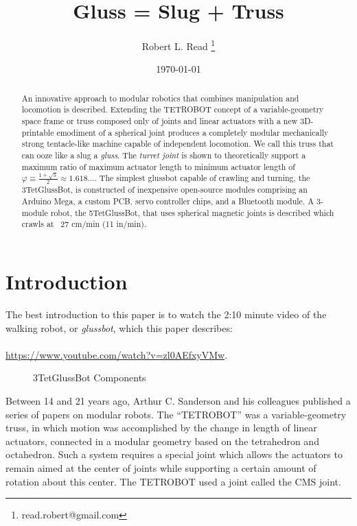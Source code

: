 \documentclass[11pt]{article}
\title{Gluss = Slug + Truss}
\author{Robert L. Read
  \thanks{read.robert@gmail.com}
}
\affil{Founder, Public Invention, an educational non-profit.}
\date{\today}
\begin{document}
\maketitle


\begin{abstract}
  An innovative approach to modular robotics that combines manipulation and locomotion is described.
  Extending the TETROBOT\cite{sanderson1996modular,lee2002dynamic,lee1999dynamics} concept of a variable-geometry
  space frame or truss composed only of joints and linear actuators with a new 3D-printable emodiment of a
  spherical joint\cite{song2003spherical}
  produces a completely modular mechanically strong tentacle-like machine capable of independent locomotion.
  We call this truss that can ooze like a slug a \emph{gluss}.
  The \emph{turret joint} is shown to theoretically support a maximum ratio of maximum actuator length to
  minimum actuator length of  $\varphi \equiv \frac{1 + \sqrt{5}}{2} \approx 1.618...$.
  The simplest glussbot capable of crawling and turning, the 3TetGlussBot, is constructed of
  inexpensive open-source modules comprising an Arduino Mega, a custom PCB, servo controller chips, and a Bluetooth module.
  A 3-module robot, the 5TetGlussBot, that uses spherical magnetic joints is described which crawls at ~27 cm/min (11 in/min).
\end{abstract}

\section{Introduction}

The best introduction to this paper is to watch the 2:10 minute video of the
walking robot, or \emph{glussbot}, which this paper describes:\\
\\
\indent \href{https://www.youtube.com/watch?v=zl0AEfxyVMw}{https://www.youtube.com/watch?v=zl0AEfxyVMw}.\\

\begin{figure}[!ht]
  \centering
    \caption[3TetGlussBot Components]{3TetGlussBot Components}
      \label{annotated}
\end{figure}


Between 14 and 21 years ago, Arthur C. Sanderson and his colleagues published a series of
papers\cite{sanderson1996modular,lee2002dynamic,lee1999dynamics} on modular robots.
The ``TETROBOT'' was a variable-geometry truss, in which motion was accomplished by the change
in length of linear actuators, connected in a modular geometry based on the tetrahedron and octahedron.  Such a system
requires a special joint which allows the actuators to remain aimed at the center of joints while supporting
a certain amount of rotation about this center.  The TETROBOT used a joint called the CMS joint.
\end{document}
